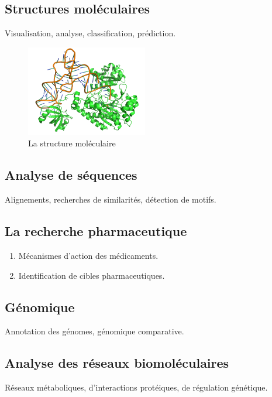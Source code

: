 \documentclass[12pt]{report}
\begin{document}
\subsection{Structures moléculaires}
  Visualisation, analyse, classification, prédiction.
  \begin{figure}[h]
  \begin{center}
  \includegraphics[width=200]{m.png} 
   \caption{La structure moléculaire}
  \end{center}  
  \end{figure}
  \subsection{Analyse de séquences}  
Alignements, recherches de similarités, détection de motifs.
\subsection{La recherche pharmaceutique}
\begin{enumerate}
\item Mécanismes d'action des médicaments.
\item Identification de cibles pharmaceutiques.
\end{enumerate}
\subsection{Génomique}
Annotation des génomes, génomique comparative.
\subsection{Analyse des réseaux biomoléculaires}
Réseaux métaboliques, d'interactions protéiques, de régulation génétique.
\end{document}
